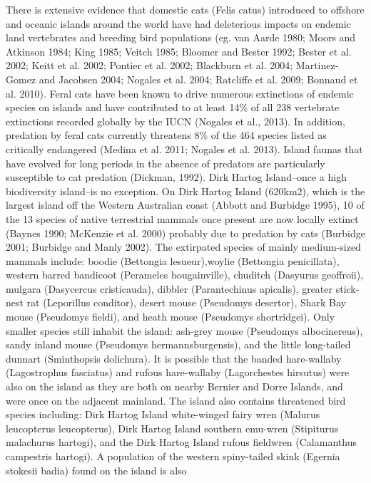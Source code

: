 \documentclass[version=last,
    paper=a4,                               %
    10pt,                                   %
    dvipsnames,
    oneside,                              %
    headings=openany,                       %
    open=any,
    BCOR=7mm,                               %
    DIV=15,     %
]{scrbook}
\begin{document}
There is extensive evidence that domestic cats (Felis catus) introduced
to offshore and oceanic islands around the world have had deleterious
impacts on endemic land vertebrates and breeding bird populations (eg.
van Aarde 1980; Moors and Atkinson 1984; King 1985; Veitch 1985; Bloomer
and Bester 1992; Bester et al. 2002; Keitt et al. 2002; Pontier et al.
2002; Blackburn et al. 2004; Martinez-Gomez and Jacobsen 2004; Nogales
et al. 2004; Ratcliffe et al. 2009; Bonnaud et al. 2010). Feral cats
have been known to drive numerous extinctions of endemic species on
islands and have contributed to at least 14\% of all 238 vertebrate
extinctions recorded globally by the IUCN (Nogales et al., 2013). In
addition, predation by feral cats currently threatens 8\% of the 464
species listed as critically endangered (Medina et al. 2011; Nogales et
al. 2013). Island faunas that have evolved for long periods in the
absence of predators are particularly susceptible to cat predation
(Dickman, 1992). Dirk Hartog Island--once a high biodiversity island--is
no exception. On Dirk Hartog Island (620km2), which is the largest
island off the Western Australian coast (Abbott and Burbidge 1995), 10
of the 13 species of native terrestrial mammals once present are now
locally extinct (Baynes 1990; McKenzie et al. 2000) probably due to
predation by cats (Burbidge 2001; Burbidge and Manly 2002). The
extirpated species of mainly medium-sized mammals include: boodie
(Bettongia lesueur),woylie (Bettongia penicillata), western barred
bandicoot (Perameles bougainville), chuditch (Dasyurus geoffroii),
mulgara (Dasycercus cristicauda), dibbler (Parantechinus apicalis),
greater stick-nest rat (Leporillus conditor), desert mouse (Pseudomys
desertor), Shark Bay mouse (Pseudomys fieldi), and heath mouse
(Pseudomys shortridgei). Only smaller species still inhabit the island:
ash-grey mouse (Pseudomys albocinereus), sandy inland mouse (Pseudomys
hermannsburgensis), and the little long-tailed dunnart (Sminthopsis
dolichura). It is possible that the banded hare-wallaby (Lagostrophus
fasciatus) and rufous hare-wallaby (Lagorchestes hirsutus) were also on
the island as they are both on nearby Bernier and Dorre Islands, and
were once on the adjacent mainland. The island also contains threatened
bird species including: Dirk Hartog Island white-winged fairy wren
(Malurus leucopterus leucopterus), Dirk Hartog Island southern emu-wren
(Stipiturus malachurus hartogi), and the Dirk Hartog Island rufous
fieldwren (Calamanthus campestris hartogi). A population of the western
spiny-tailed skink (Egernia stokesii badia) found on the island is also
\end{document}
